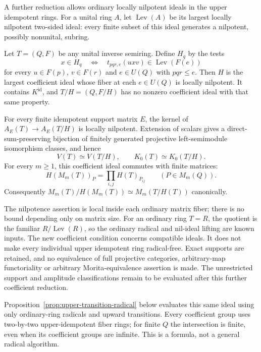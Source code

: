 A further reduction allows ordinary locally nilpotent ideals in the
upper idempotent rings. For a unital ring $A$, let $\operatorname{Lev}(A)$
be its largest locally nilpotent two-sided ideal: every finite subset
of this ideal generates a nilpotent, possibly nonunital, subring.

\begin{theorem}
\label{thm:upper-levitzki-quotient}
Let $T=(Q,F)$ be any unital inverse semiring. Define $H_q$ by the tests
\[
 x\in H_q\quad\Longleftrightarrow\quad
 t_{pqr,e}(uxv)\in\operatorname{Lev}(F(e))
\]
for every $u\in F(p)$, $v\in F(r)$ and $e\in U(Q)$ with $pqr\leq e$.
Then $H$ is the largest coefficient ideal whose fiber at each
$e\in U(Q)$ is locally nilpotent. It contains $K^{\mathrm{id}}$, and
$T/H=(Q,F/H)$ has no nonzero coefficient ideal with that same property.

For every finite idempotent support matrix $E$, the kernel of
$A_E(T)\to A_E(T/H)$ is locally nilpotent. Extension of scalars gives
a direct-sum-preserving bijection of finitely generated projective
left-semimodule isomorphism classes, and hence
\[
 V(T)\simeq V(T/H),\qquad K_0(T)\simeq K_0(T/H).
\]
For every $m\geq1$, this coefficient ideal commutes with finite matrices:
\[
 H(M_m(T))_P=\prod_{i,j}H(T)_{P_{ij}}
 \qquad(P\in M_m(Q)).
\]
Consequently $M_m(T)/H(M_m(T))\simeq M_m(T/H(T))$ canonically.
\end{theorem}

The nilpotence assertion is local inside each ordinary matrix fiber;
there is no bound depending only on matrix size. For an ordinary ring
$T=R$, the quotient is the familiar $R/\operatorname{Lev}(R)$, so the
ordinary radical and nil-ideal lifting are known inputs. The new
coefficient condition concerns compatible ideals. It does not make
every individual upper idempotent ring radical-free. Exact supports
are retained, and no equivalence of full projective categories,
arbitrary-map functoriality or arbitrary Morita-equivalence assertion
is made. The unrestricted support and amplitude classifications
remain to be evaluated after this further coefficient reduction.


Proposition~\ref{prop:upper-transition-radical} below evaluates this
same ideal using only ordinary-ring radicals and upward transitions.
Every coefficient group uses two-by-two upper-idempotent fiber rings;
for finite $Q$ the intersection is finite, even when its coefficient
groups are infinite. This is a formula, not a general radical algorithm.
